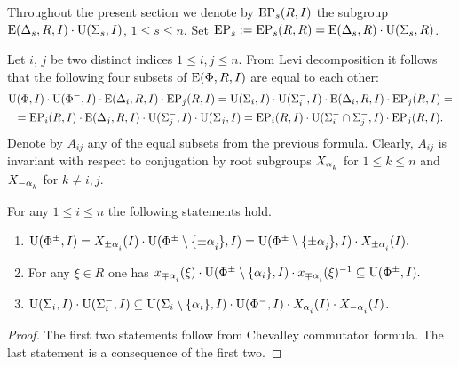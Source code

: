 Throughout the present section we denote by $\operatorname{EP}_s(R, I)$ the subgroup $\operatorname{E}(\Delta_s, R, I) \cdot \operatorname{U}(\Sigma_s, I)$, $1 \leq s \leq n$.
Set $\operatorname{EP}_s := \operatorname{EP}_s(R, R) = \operatorname{E}(\Delta_s, R) \cdot \operatorname{U}(\Sigma_s, R)$. 

Let $i$, $j$ be two distinct indices $1\leq i,j \leq n$. From Levi decomposition it follows that the following four subsets of $\operatorname{E}(\Phi, R, I)$ are equal to each other:
\begin{multline}\nonumber \operatorname{U}(\Phi, I)\cdot \operatorname{U}(\Phi^-, I) \cdot \operatorname{E}(\Delta_i, R, I) \cdot \operatorname{EP}_j(R, I) = \operatorname{U}(\Sigma_i, I)\cdot \operatorname{U}(\Sigma^-_i, I) \cdot \operatorname{E}(\Delta_i, R, I) \cdot \operatorname{EP}_j(R, I) = \\
= \operatorname{EP}_i(R, I) \cdot \operatorname{E}(\Delta_j, R, I) \cdot \operatorname{U}(\Sigma_j^-, I)\cdot \operatorname{U}(\Sigma_j, I) = \operatorname{EP}_i(R, I) \cdot \operatorname{U}(\Sigma^-_i\cap \Sigma^-_j, I) \cdot \operatorname{EP}_j(R, I). \end{multline}
Denote by $A_{ij}$ any of the equal subsets from the previous formula. 
Clearly, $A_{ij}$ is invariant with respect to conjugation by root subgroups $X_{\alpha\ssub{k}}$ for $1\leq k\leq n$ and $X_{-\alpha\ssub{k}}$ for $k\neq i,j$.

\begin{lemma}\label{lemma:dv_unipotent} For any $1\leq i\leq n$ the following statements hold. \begin{enumerate} 
\item $\U(\Phi^\pm, I) = X_{\pm\alpha\ssub{i}}(I)\cdot \U(\Phi^\pm\setminus\{\pm\alpha\ssub{i}\}, I) = \U(\Phi^\pm\setminus\{\pm\alpha\ssub{i}\}, I)\cdot X_{\pm\alpha\ssub{i}}(I).$
\item For any $\xi\in R$ one has $x_{\mp\alpha\ssub{i}}(\xi)\cdot \U(\Phi^\pm\setminus\{\alpha_i\}, I)\cdot x_{\mp\alpha\ssub{i}}(\xi)^{-1} \subseteq \U(\Phi^\pm, I).$
\item $\U(\Sigma_i, I)\cdot \U(\Sigma^-_i, I) \subseteq \U(\Sigma_i\setminus \{\alpha_i\}, I) \cdot \U(\Phi^-, I) \cdot X_{\alpha\ssub{i}}(I) \cdot X_{-\alpha\ssub{i}}(I)$.
\end{enumerate} \end{lemma}
\begin{proof}
 The first two statements follow from Chevalley commutator formula. The last statement is a consequence of the first two.
\end{proof}

